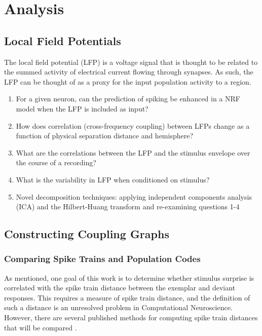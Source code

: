 \section{Analysis}

\subsection{Local Field Potentials}

The local field potential (LFP) is a voltage signal that is thought to be related to the summed
activity of electrical current flowing through synapses. As such, the LFP can be thought of as
a proxy for the input population activity to a region. 

\begin{enumerate}
\item
For a given neuron, can the prediction of spiking be enhanced in a NRF model when the LFP is included as input?
\item
How does correlation (cross-frequency coupling) between LFPs change as a function of physical
separation distance and hemisphere?
\item
What are the correlations between the LFP and the stimulus envelope over the course of a recording?
\item
What is the variability in LFP when conditioned on stimulus?
\item
Novel decomposition techniques: applying independent components analysis (ICA) and the Hilbert-Huang
transform and re-examining questions 1-4
\end{enumerate}



\subsection{Constructing Coupling Graphs}
\label{sec:constructing_coupling_graphs}

\subsubsection{Comparing Spike Trains and Population Codes}

As mentioned, one goal of this work is to determine whether stimulus surprise is correlated with
the spike train distance between the exemplar and deviant responses. This requires a measure of
spike train distance, and the definition of such a distance is an unresolved problem in Computational
Neuroscience. However, there are several published methods for computing spike train distances that
will be compared \cite{Victor2005,Wu2012}. 

